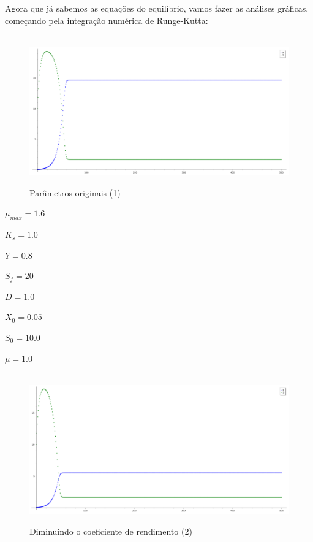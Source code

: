 \documentclass{article}
\begin{document}
\newpage
\\\\Agora que já sabemos as equações do equilíbrio, vamos fazer as análises gráficas, começando pela integração numérica de Runge-Kutta:
\begin{figure}[H]
        \centering
        \hbox{\hspace{1.0em} \includegraphics[scale=0.5]{Modelo_1.png}} 
        \caption*{Parâmetros originais (1)}
\end{figure}
\vspace{-7mm}
\begin{itemize}
\begin{multicols}{4}
    \item $\mu_{max} = 1.6$ 
    \item $K_s = 1.0$ 
\columnbreak     
    \item $Y = 0.8$ 
    \item $S_f = 20$ 
\columnbreak    
    \item $D = 1.0$ 
    \item $X_0 = 0.05$ 
\columnbreak     
    \item $S_0 = 10.0$ 
    \item $\mu = 1.0$
\end{multicols}
\end{itemize}
\begin{figure}[H]
        \centering
        \hbox{\hspace{1.0em} \includegraphics[scale=0.5]{Modelo_2.png}} 
        \caption*{Diminuindo o coeficiente de rendimento (2)}
\end{figure}
\end{document}
